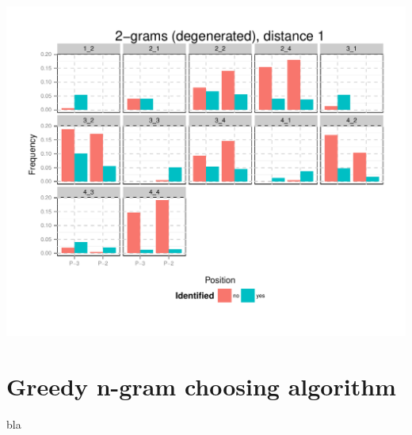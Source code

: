 \documentclass[10pt]{beamer}\usepackage[]{graphicx}\usepackage[]{color}
\makeatletter
\def\maxwidth{ %
  \ifdim\Gin@nat@width>\linewidth
    \linewidth
  \else
    \Gin@nat@width
  \fi
}
\makeatother
\begin{document}
\begin{frame}

\includegraphics[width=\maxwidth]{figure/unnamed-chunk-9-1} 

\end{frame}

\section{Greedy n-gram choosing algorithm}

\begin{frame}
bla
\end{frame}
\end{document}
